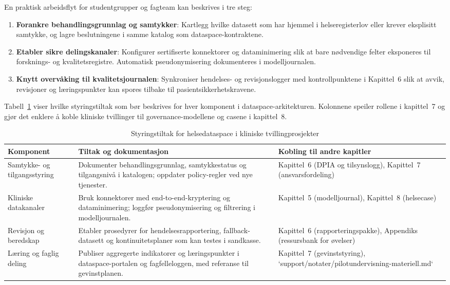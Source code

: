 En praktisk arbeidsflyt for studentgrupper og fagteam kan beskrives i tre steg:
\begin{enumerate}
    \item \textbf{Forankre behandlingsgrunnlag og samtykker}: Kartlegg hvilke datasett som har hjemmel i helseregisterlov eller krever eksplisitt samtykke, og lagre beslutningene i samme katalog som dataspace-kontraktene.
    \item \textbf{Etabler sikre delingskanaler}: Konfigurer sertifiserte konnektorer og dataminimering slik at bare nødvendige felter eksponeres til forsknings- og kvalitetsregistre. Automatisk pseudonymisering dokumenteres i modelljournalen.\citep{datatilsynet2023dpia}
    \item \textbf{Knytt overvåking til kvalitetsjournalen}: Synkroniser hendelses- og revisjonslogger med kontrollpunktene i Kapittel~6 slik at avvik, revisjoner og læringspunkter kan spores tilbake til pasientsikkerhetskravene.\citep{ehelse2024tilsyn}
\end{enumerate}

Tabell~\ref{tab:kap03-helsedataspace} viser hvilke styringstiltak som bør beskrives for hver komponent i dataspace-arkitekturen.
Kolonnene speiler rollene i kapittel~7 og gjør det enklere å koble kliniske tvillinger til governance-modellene og casene i
kapittel~8.

\begin{table}[htbp]
    \centering
    \caption{Styringstiltak for helsedataspace i kliniske tvillingprosjekter}
    \label{tab:kap03-helsedataspace}
    \begin{tabular}{p{3.6cm}p{5.0cm}p{4.4cm}}
        \toprule
        \textbf{Komponent} & \textbf{Tiltak og dokumentasjon} & \textbf{Kobling til andre kapitler} \\
        \midrule
        Samtykke- og tilgangsstyring & Dokumenter behandlingsgrunnlag, samtykkestatus og tilgangsnivå i katalogen; oppdater policy-regler ved nye tjenester. & Kapittel~6 (DPIA og tilsynslogg), Kapittel~7 (ansvarsfordeling) \\
        Kliniske datakanaler & Bruk konnektorer med end-to-end-kryptering og dataminimering; loggfør pseudonymisering og filtrering i modelljournalen. & Kapittel~5 (modelljournal), Kapittel~8 (helsecase) \\
        Revisjon og beredskap & Etabler prosedyrer for hendelsesrapportering, fallback-datasett og kontinuitetsplaner som kan testes i sandkasse. & Kapittel~6 (rapporteringspakke), Appendiks (ressursbank for øvelser) \\
        Læring og faglig deling & Publiser aggregerte indikatorer og læringspunkter i dataspace-portalen og fagfelleloggen, med referanse til gevinstplanen. & Kapittel~7 (gevinststyring), `support/notater/pilotundervisning-materiell.md` \\
        \bottomrule
    \end{tabular}
\end{table}

